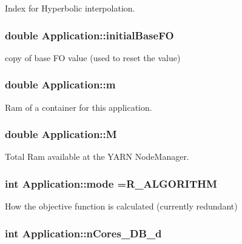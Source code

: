 Index for Hyperbolic interpolation. 

\hypertarget{classApplication_a95fd54cbed658fb23ce27939666c91d2}{
\subsubsection[{initial\-Base\-F\-O}]{\setlength{\rightskip}{0pt plus 5cm}double Application\-::initial\-Base\-F\-O}}\label{classApplication_a95fd54cbed658fb23ce27939666c91d2}


copy of base F\-O value (used to reset the value) 

\hypertarget{classApplication_ab903d83d3cde51569a27f97752c9f158}{
\subsubsection[{m}]{\setlength{\rightskip}{0pt plus 5cm}double Application\-::m}}\label{classApplication_ab903d83d3cde51569a27f97752c9f158}


Ram of a container for this application. 

\hypertarget{classApplication_a14904a2abf46cc0a50eb82043fa0912e}{
\subsubsection[{M}]{\setlength{\rightskip}{0pt plus 5cm}double Application\-::\-M}}\label{classApplication_a14904a2abf46cc0a50eb82043fa0912e}


Total Ram available at the Y\-A\-R\-N Node\-Manager. 

\hypertarget{classApplication_abc7e87e8cbe2e64fa4e2ff2afdf7a4fc}{
\subsubsection[{mode}]{\setlength{\rightskip}{0pt plus 5cm}int Application\-::mode ={\bf R\-\_\-\-A\-L\-G\-O\-R\-I\-T\-H\-M}}}\label{classApplication_abc7e87e8cbe2e64fa4e2ff2afdf7a4fc}


How the objective function is calculated (currently redundant) 

\hypertarget{classApplication_a95104d330c9c7ed2c1017b4938a39a9a}{
\subsubsection[{n\-Cores\-\_\-\-D\-B\-\_\-d}]{\setlength{\rightskip}{0pt plus 5cm}int Application\-::n\-Cores\-\_\-\-D\-B\-\_\-d}}\label{classApplication_a95104d330c9c7ed2c1017b4938a39a9a}


